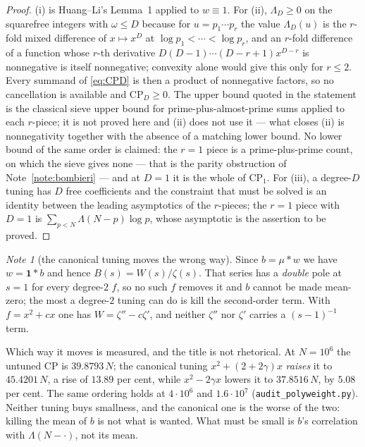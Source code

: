 \documentclass[11pt,a4paper]{article}
\theoremstyle{plain}
\theoremstyle{definition}
\theoremstyle{remark}
\newtheorem{note}[theorem]{Note}
\begin{document}
\begin{proof}
(i) is Huang--Li's Lemma~1 applied to $w\equiv1$. For (ii),
$\Lambda_D\ge0$ on the squarefree integers with $\omega\le D$ because
for $u=p_1\cdots p_r$ the value $\Lambda_D(u)$ is the $r$-fold mixed
difference of $x\mapsto x^D$ at $\log p_1<\cdots<\log p_r$, and an
$r$-fold difference of a function whose $r$-th derivative
$D(D-1)\cdots(D-r+1)x^{D-r}$ is nonnegative is itself nonnegative;
convexity alone would give this only for $r\le2$. Every summand of
\eqref{eq:CPD} is then a product of nonnegative factors, so no
cancellation is available and $\mathrm{CP}_D\ge0$. The upper bound
quoted in the statement is the classical sieve upper bound for
prime-plus-almost-prime sums applied to each $r$-piece; it is not
proved here and (ii) does not use it --- what closes (ii) is
nonnegativity together with the absence of a matching lower bound.
No lower bound of the same order is claimed:
the $r=1$ piece is a prime-plus-prime count, on which the sieve gives
none --- that is the parity obstruction of Note~\ref{note:bombieri} ---
and at $D=1$ it is the whole of $\mathrm{CP}_1$. For
(iii), a degree-$D$ tuning has $D$ free coefficients and the
constraint that must be solved is an identity between the leading
asymptotics of the $r$-pieces; the $r=1$ piece with $D=1$ is
$\sum_{p<N}\Lambda(N-p)\log p$, whose asymptotic is the assertion to
be proved.
\end{proof}

\begin{note}[the canonical tuning moves the wrong way]
Since $b=\mu*w$ we have $w=\mathbf 1*b$ and hence
$B(s)=W(s)/\zeta(s)$. That series has a \emph{double} pole at $s=1$
for every degree-$2$ $f$, so no such $f$ removes it and $b$ cannot be
made mean-zero; the most a degree-$2$ tuning can do is kill the
second-order term. With $f=x^2+cx$ one has $W=\zeta''-c\zeta'$, and
neither $\zeta''$ nor $\zeta'$ carries a $(s-1)^{-1}$ term.

Which way it moves is measured, and the title is not rhetorical. At
$N=10^6$ the untuned $\mathrm{CP}$ is $39.8793\,N$; the canonical
tuning $x^2+(2+2\gamma)x$ \emph{raises} it to $45.4201\,N$, a rise of
$13.89$ per cent, while $x^2-2\gamma x$ lowers it to $37.8516\,N$, by
$5.08$ per cent. The same ordering holds at $4\cdot10^6$ and
$1.6\cdot10^7$ (\texttt{audit\_polyweight.py}). Neither tuning buys
smallness, and the canonical one is the worse of the two: killing the
mean of $b$ is not what is wanted. What must be small is $b$'s
correlation with $\Lambda(N-\cdot)$, not its mean.
\end{note}
\end{document}
